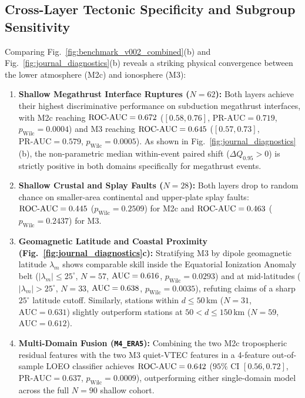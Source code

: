 ﻿\documentclass[journal]{IEEEtran}
\begin{document}
\subsection{Cross-Layer Tectonic Specificity and Subgroup Sensitivity}
Comparing Fig.~\ref{fig:benchmark_v002_combined}(b) and Fig.~\ref{fig:journal_diagnostics}(b) reveals a striking physical convergence between the lower atmosphere (M2c) and ionosphere (M3):
\begin{enumerate}
    \item \textbf{Shallow Megathrust Interface Ruptures ($N=62$):} Both layers achieve their highest discriminative performance on subduction megathrust interfaces, with M2c reaching $\text{ROC-AUC} = 0.672$ ($[0.58, 0.76]$, $\text{PR-AUC} = 0.719$, $p_{\text{Wilc}} = 0.0004$) and M3 reaching $\text{ROC-AUC} = 0.645$ ($[0.57, 0.73]$, $\text{PR-AUC} = 0.579$, $p_{\text{Wilc}} = 0.0005$). As shown in Fig.~\ref{fig:journal_diagnostics}(b), the non-parametric median within-event paired shift ($\Delta Q_{0.95} > 0$) is strictly positive in both domains specifically for megathrust events.
    \item \textbf{Shallow Crustal and Splay Faults ($N=28$):} Both layers drop to random chance on smaller-area continental and upper-plate splay faults: $\text{ROC-AUC} = 0.445$ ($p_{\text{Wilc}} = 0.2509$) for M2c and $\text{ROC-AUC} = 0.463$ ($p_{\text{Wilc}} = 0.2437$) for M3.
    \item \textbf{Geomagnetic Latitude and Coastal Proximity (Fig.~\ref{fig:journal_diagnostics}c):} Stratifying M3 by dipole geomagnetic latitude $\lambda_m$ shows comparable skill inside the Equatorial Ionization Anomaly belt ($\lvert\lambda_m\rvert \le 25^\circ$, $N=57$, $\text{AUC} = 0.616$, $p_{\text{Wilc}} = 0.0293$) and at mid-latitudes ($\lvert\lambda_m\rvert > 25^\circ$, $N=33$, $\text{AUC} = 0.638$, $p_{\text{Wilc}} = 0.0035$), refuting claims of a sharp $25^\circ$ latitude cutoff. Similarly, stations within $d \le 50$\,km ($N=31$, $\text{AUC} = 0.631$) slightly outperform stations at $50 < d \le 150$\,km ($N=59$, $\text{AUC} = 0.612$).
    \item \textbf{Multi-Domain Fusion (\texttt{M4\_ERA5}):} Combining the two M2c tropospheric residual features with the two M3 quiet-VTEC features in a 4-feature out-of-sample LOEO classifier achieves $\text{ROC-AUC} = 0.642$ ($95\%$ CI $[0.56, 0.72]$, $\text{PR-AUC} = 0.637$, $p_{\text{Wilc}} = 0.0009$), outperforming either single-domain model across the full $N=90$ shallow cohort.
\end{enumerate}
\end{document}
